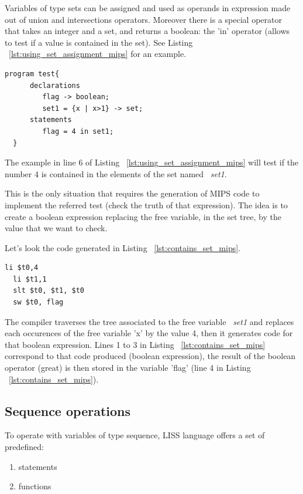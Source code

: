 \documentclass[
  oneside,
  11pt, a4paper,
  footinclude=true,
  headinclude=true,
  cleardoublepage=empty
]{scrbook}
\begin{document}
Variables of type sets can be assigned and used as operands in expression made out of union and intersections operators. Moreover there is a special operator that takes an integer and a set, and returns a boolean: the 'in' operator (allows to test if a value is contained in the set). See Listing ~\ref{lst:using_set_assignment_mips} for an example.

\begin{lstlisting}[caption={Example of using a set in LISS},label={lst:using_set_assignment_mips}]
  program test{
      declarations
         flag -> boolean;
         set1 = {x | x>1} -> set;
      statements
         flag = 4 in set1;
  }
\end{lstlisting}

The example in line 6 of Listing ~\ref{lst:using_set_assignment_mips} will test if the number 4 is contained in the elements of the set named ~\textit{set1}.

This is the only situation that requires the generation of MIPS code to implement the referred test (check the truth of that expression). The idea is to create a boolean expression replacing the free variable, in the set tree, by the value that we want to check.

Let's look the code generated in Listing ~\ref{lst:contains_set_mips}.

\begin{lstlisting}[caption={Code generated for line 6 of Listing ~\ref{lst:using_set_assignment_mips}},label={lst:contains_set_mips}]
  li $t0,4		
  li $t1,1		
  slt $t0, $t1, $t0	
  sw $t0, flag		
\end{lstlisting}

The compiler traverses the tree associated to the free variable ~\textit{set1} and replaces each occurences of the free variable 'x' by the value 4, then it generates code for that boolean expression. Lines 1 to 3 in Listing ~\ref{lst:contains_set_mips} correspond to that code produced (boolean expression), the result of the boolean operator (great) is then stored in the variable 'flag' (line 4 in Listing ~\ref{lst:contains_set_mips}).

\subsection{Sequence operations}

To operate with variables of type sequence, LISS language offers a set of predefined:

\begin{enumerate}
\item statements
\item functions
\end{enumerate}
\end{document}
